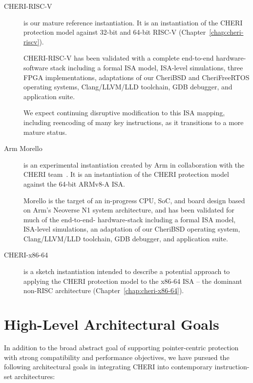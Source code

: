 \begin{description}
\item[CHERI-RISC-V] is our mature reference instantiation.
  It is an instantiation of the CHERI protection model against 32-bit and
  64-bit RISC-V (Chapter~\ref{chap:cheri-riscv}).

  CHERI-RISC-V has been validated with a complete end-to-end hardware-software
  stack including a formal ISA model, ISA-level simulations, three FPGA
  implementations, adaptations of our CheriBSD and CheriFreeRTOS operating
  systems, Clang/LLVM/LLD toolchain, GDB debugger, and application suite.

  We expect continuing disruptive modification to this ISA mapping, including
  reencoding of many key instructions, as it transitions to a more mature
  status.

\item[Arm Morello] is an experimental instantiation created by Arm
  in collaboration with the CHERI team~\cite{arm-morello}.
  It is an instantiation of the CHERI protection model against the 64-bit
  ARMv8-A ISA.

  Morello is the target of an in-progress CPU, SoC, and board design based on
  Arm's Neoverse N1 system architecture, and has been validated for much of
  the end-to-end- hardware-stack including a formal ISA model, ISA-level
  simulations, an adaptation of our CheriBSD operating system, Clang/LLVM/LLD
  toolchain, GDB debugger, and application suite.

\item[CHERI-x86-64] is a sketch instantiation intended to describe
  a potential approach to applying the CHERI protection model to the x86-64
  ISA -- the dominant non-RISC architecture (Chapter~\ref{chap:cheri-x86-64}).
\end{description}

\section{High-Level Architectural Goals}

In addition to the broad abstract goal of supporting pointer-centric
protection with strong compatibility and performance objectives, we have
pursued the following architectural goals in integrating CHERI into
contemporary instruction-set architectures:

